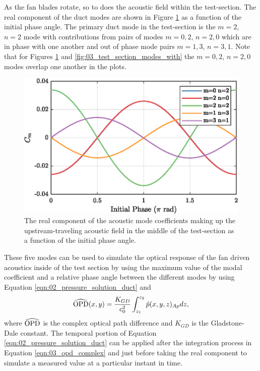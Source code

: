 As the fan blades rotate, so to does the acoustic field within the test-section.
The real component of the duct modes are shown in Figure \ref{fig:03_test_section_modes} as a function of the initial phase angle.
The primary duct mode in the test-section is the $m=2$, $n=2$ mode with contributions from pairs of modes $m=0,2$, $n=2,0$ which are in phase with one another and out of phase mode pairs $m=1,3$, $n=3,1$.
Note that for Figures \ref{fig:03_test_section_modes} and \ref{fig:03_test_section_modes_with} the $m=0,2$, $n=2,0$ modes overlap one another in the plots.
\begin{figure}
  \centering
  \includegraphics{../matlab/03_aero_optics_acoustics/tunnel_acoustic_against_0.6_8_0.eps}
  \caption{The real component of the acoustic mode coefficients making up the upstream-traveling acoustic field in the middle of the test-section as a function of the initial phase angle.}
  \label{fig:03_test_section_modes}
\end{figure}
These five modes can be used to simulate the optical response of the fan driven acoustics inside of the test section by using the maximum value of the modal coefficient and a relative phase angle between the different modes by using Equation \ref{eqn:02_pressure_solution_duct} and
\begin{equation}
  \widehat{\operatorname{OPD}}(x,y) = \frac{K_{GD}}{c_0^2}\int_{z_1}^{z_2} \hat{p}(x,y,z)_{Ap}dz \textrm{,}
  \label{eqn:03_opd_complex}
\end{equation}
where $\widehat{\operatorname{OPD}}$ is the complex optical path difference and $K_{GD}$ is the Gladstone-Dale constant.
The temporal portion of Equation \ref{eqn:02_pressure_solution_duct} can be applied after the integration process in Equation \ref{eqn:03_opd_complex} and just before taking the real component to simulate a measured value at a particular instant in time.

